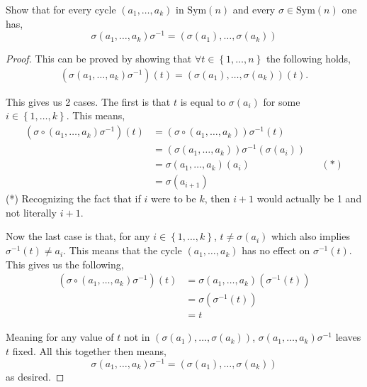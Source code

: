 \documentclass[11pt]{article}
\newenvironment{problem}[2][Problem\!]{\begin{trivlist}
\item[\hskip \labelsep {\bfseries #1}\hskip \labelsep {\bfseries #2}]}{\end{trivlist}}
\newcommand{\set}[1]{\left\{#1\right\}} %
\newcommand{\sy}[1]{\text{Sym}(#1)}
\begin{document}
\begin{tcolorbox}
    \begin{problem} {6.1}
        Show that for every cycle $(a_1, \dots , a_k)$ in $\sy n$ and every $\sigma \in \sy n$ one has,
        \[\sigma (a_1, \dots, a_k)\sigma^{-1} = (\sigma(a_1),\dots, \sigma(a_k))\]
    \end{problem}
\end{tcolorbox}
\begin{proof}
    This can be proved by showing that $\forall t \in \set{1,\dots,n}$ the following holds,
    \begin{align*}
        (\sigma (a_1, \dots, a_k)\sigma^{-1})(t) = (\sigma(a_1),\dots, \sigma(a_k))(t).
    \end{align*}

    This gives us 2 cases. The first is that $t$ is equal to $\sigma(a_i)$ for some $i\in \set{1,\dots, k}$. This means,
    \begin{align*}
        (\sigma \circ (a_1, \dots, a_k)\sigma^{-1})(t) &= (\sigma \circ (a_1, \dots, a_k))\sigma^{-1}(t) \\
        &= (\sigma(a_1, \dots, a_k))\sigma^{-1}(\sigma(a_i)) \\
        &= \sigma(a_1, \dots, a_k)(a_i) && (*) \\
        &= \sigma(a_{i+1}) 
    \end{align*}
    (*) Recognizing the fact that if $i$ were to be $k$, then $i +1$ would actually be 1 and not literally $i+1$.

    Now the last case is that, for any $i \in \set{1,\dots, k}$, $t \neq \sigma(a_i)$ which also implies $\sigma^{-1}(t) \neq a_i$. This means that the cycle $(a_1,\dots, a_k)$ has no effect on $\sigma^{-1}(t)$. This gives us the following,
    \begin{align*}
        (\sigma \circ (a_1, \dots, a_k)\sigma^{-1})(t) &= \sigma(a_1, \dots, a_k)(\sigma^{-1}(t)) \\
        &= \sigma(\sigma^{-1}(t)) \\
        &= t
    \end{align*}

    Meaning for any value of $t$ not in $(\sigma(a_1),\dots, \sigma(a_k))$, $\sigma(a_1,\dots, a_k)\sigma^{-1}$ leaves $t$ fixed. All this together then means,  
    \[\sigma  (a_1, \dots, a_k)\sigma^{-1} = (\sigma(a_1),\dots, \sigma(a_k))\]
    as desired.
\end{proof}
\end{document}
